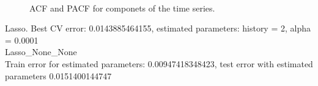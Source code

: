 \documentclass[12pt]{article}
\begin{document}
\begin{figure}
\\ 
\caption{ACF and PACF for componets of the time series.} \label{fg:acf}
\end{figure}
Lasso. Best CV error: 0.0143885464155, estimated parameters: history = 2, alpha = 0.0001 \\ 
Lasso\_None\_None\\ 
Train error for estimated parameters: 0.00947418348423, test error with estimated parameters 0.0151400144747 \\ 
\end{document}
